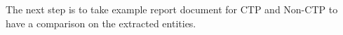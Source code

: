 The next step is to take example report document for CTP and Non-CTP to have a comparison on the extracted entities.  







































%

